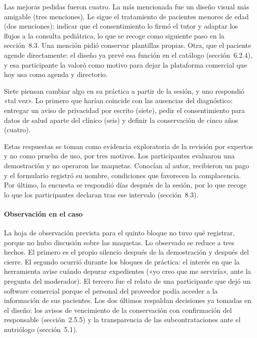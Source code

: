 \documentclass[12pt, a4paper]{article}
\begin{document}
Las mejoras pedidas fueron cuatro. La más mencionada fue un diseño
visual más amigable (tres menciones). Le sigue el tratamiento de
pacientes menores de edad (dos menciones): indicar que el consentimiento
lo firmó el tutor y adaptar los flujos a la consulta pediátrica, lo que
se recoge como siguiente paso en la sección~8.3. Una mención pidió
conservar plantillas propias. Otra, que el paciente agende directamente:
el diseño ya prevé esa función en el catálogo (sección~6.2.4), y esa
participante la valoró como motivo para dejar la plataforma comercial
que hoy usa como agenda y directorio.

Siete piensan cambiar algo en su práctica a partir de la sesión, y uno
respondió «tal vez». Lo primero que harían coincide con las ausencias
del diagnóstico: entregar un aviso de privacidad por escrito (siete),
pedir el consentimiento para datos de salud aparte del clínico (seis) y
definir la conservación de cinco años (cuatro).

Estas respuestas se toman como evidencia exploratoria de la revisión por
expertos y no como prueba de uso, por tres motivos. Los participantes
evaluaron una demostración y no operaron las maquetas. Conocían al
autor, recibieron un pago y el formulario registró su nombre,
condiciones que favorecen la complacencia. Por último, la encuesta se
respondió días después de la sesión, por lo que recoge lo que los
participantes declaran tras ese intervalo (sección~8.3).

\paragraph{Observación en el caso}
La hoja de observación prevista para el quinto bloque no tuvo qué
registrar, porque no hubo discusión sobre las maquetas. Lo observado se
reduce a tres hechos. El primero es el propio silencio después de la
demostración y después del cierre. El segundo ocurrió durante los
bloques de práctica: el interés en que la herramienta avise cuándo
depurar expedientes («yo creo que me serviría», ante la pregunta del
moderador). El tercero fue el relato de una participante que dejó un
software comercial porque el personal del proveedor podía acceder a la
información de sus pacientes. Los dos últimos respaldan decisiones ya
tomadas en el diseño: los avisos de vencimiento de la conservación con
confirmación del responsable (sección~2.5.5) y la transparencia de las
subcontrataciones ante el nutriólogo (sección~5.1).
 

\end{document}
